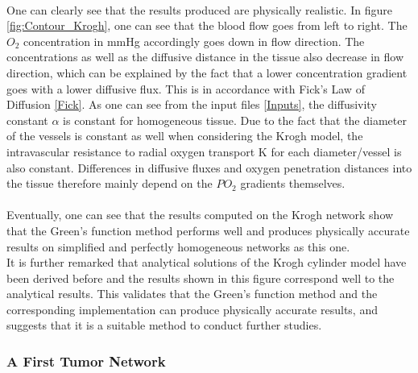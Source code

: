 \\One can clearly see that the results produced are physically realistic. In figure \ref{fig:Contour_Krogh}, one can see that the blood flow goes from left to right. The $O_2$ concentration in mmHg accordingly goes down in flow direction. The concentrations as well as the diffusive distance in the tissue also decrease in flow direction, which can be explained by the fact that a lower concentration gradient goes with a lower diffusive flux. This is in accordance with Fick's Law of Diffusion \ref{Fick}. As one can see from the input files \ref{Inputs}, the diffusivity constant $\alpha$ is constant for homogeneous tissue. Due to the fact that the diameter of the vessels is constant as well when considering the Krogh model, the intravascular resistance to radial oxygen transport K for each diameter/vessel is also constant. Differences in diffusive fluxes and oxygen penetration distances into the tissue therefore mainly depend on the $PO_2$ gradients themselves.\\
\\Eventually, one can see that the results computed on the Krogh network show that the Green's function method performs well and produces physically accurate results on simplified and perfectly homogeneous networks as this one.
\\It is further remarked that analytical solutions of the Krogh cylinder model have been derived before and the results shown in this figure correspond well to the  analytical results. This validates that the Green's function method and the corresponding implementation can produce physically accurate results, and suggests that it is a suitable method to conduct further studies.

\newpage
\subsubsection*{A First Tumor Network}

